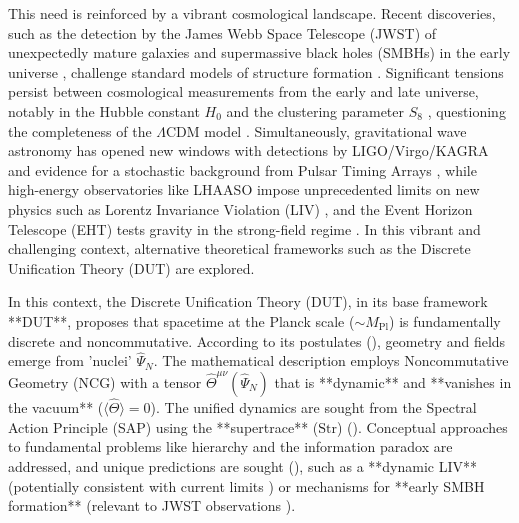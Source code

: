 \documentclass[11pt, a4paper]{article}
\theoremstyle{remark}
\newcommand{\Op}[1]{\hat{#1}}
\newcommand{\Str}{\mathrm{Str}}
\newcommand{\Mpl}{M_{\mathrm{Pl}}}
\begin{document}
This need is reinforced by a vibrant cosmological landscape. Recent discoveries, such as the detection by the James Webb Space Telescope (JWST) of unexpectedly mature galaxies and supermassive black holes (SMBHs) in the early universe \citep[e.g.,][]{Labbe:2023}, challenge standard models of structure formation \citep{Banados:2017unc, Volonteri:2010wz}. Significant tensions persist between cosmological measurements from the early and late universe, notably in the Hubble constant \(H_0\) and the clustering parameter \(S_8\) \citep[e.g.,][]{Abdalla:2022}, questioning the completeness of the $\Lambda$CDM model \citep[e.g.,][]{Planck:2018vyg}. Simultaneously, gravitational wave astronomy has opened new windows with detections by LIGO/Virgo/KAGRA \citep[e.g.,][]{LVK:GWTC3} and evidence for a stochastic background from Pulsar Timing Arrays \citep[e.g.,][]{NANOGrav:2023gor}, while high-energy observatories like LHAASO impose unprecedented limits on new physics such as Lorentz Invariance Violation (LIV) \citep[e.g.,][]{LHAASO_GRB221009A_LIV}, and the Event Horizon Telescope (EHT) tests gravity in the strong-field regime \citep[e.g.,][]{EHT:SgrA_PaperI}. In this vibrant and challenging context, alternative theoretical frameworks such as the Discrete Unification Theory (DUT) are explored.

In this context, the Discrete Unification Theory (DUT), in its base framework **DUT**, proposes that spacetime at the Planck scale (\(\sim \Mpl\)) is fundamentally discrete and noncommutative. According to its postulates (), geometry and fields emerge from 'nuclei' \( \Op{\Psi}_N \). The mathematical description employs Noncommutative Geometry (NCG) \citep{Connes1994, Madore1995, GraciaBondia2001NCG} with a tensor \( \Op{\Theta}^{\mu\nu}(\Op{\Psi}_N) \) that is **dynamic** and **vanishes in the vacuum** (\( \langle \Op{\Theta} \rangle = 0 \)). The unified dynamics are sought from the Spectral Action Principle (SAP) \citep{ConnesChamseddine1997} using the **supertrace** (\(\Str\)) (). Conceptual approaches to fundamental problems like hierarchy and the information paradox are addressed, and unique predictions are sought (), such as a **dynamic LIV** (potentially consistent with current limits \citep[e.g.,][]{LHAASO_GRB221009A_LIV}) or mechanisms for **early SMBH formation** (relevant to JWST observations \citep[e.g.,][]{Labbe:2023}).
\end{document}
